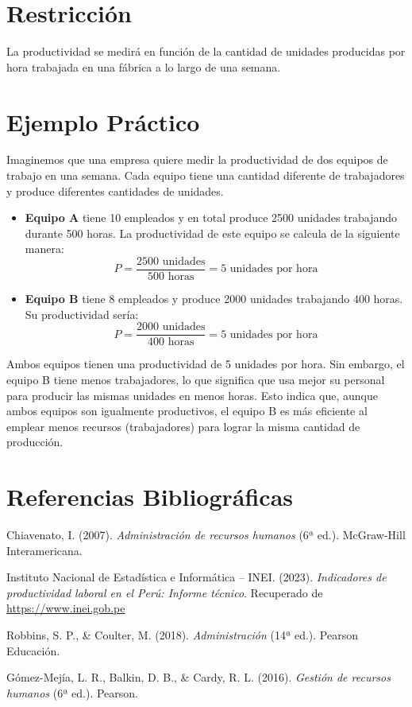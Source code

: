 \documentclass[]{article}
\begin{document}
	\section*{Restricción}
	
	La productividad se medirá en función de la cantidad de unidades producidas por hora trabajada en una fábrica a lo largo de una semana.
	
	\section*{Ejemplo Práctico}
	
	Imaginemos que una empresa quiere medir la productividad de dos equipos de trabajo en una semana. Cada equipo tiene una cantidad diferente de trabajadores y produce diferentes cantidades de unidades.
	
	\begin{itemize}
		\item \textbf{Equipo A} tiene 10 empleados y en total produce 2500 unidades trabajando durante 500 horas. La productividad de este equipo se calcula de la siguiente manera:
		\[
		P = \frac{2500 \text{ unidades}}{500 \text{ horas}} = 5 \text{ unidades por hora}
		\]
		\item \textbf{Equipo B} tiene 8 empleados y produce 2000 unidades trabajando 400 horas. Su productividad sería:
		\[
		P = \frac{2000 \text{ unidades}}{400 \text{ horas}} = 5 \text{ unidades por hora}
		\]
	\end{itemize}
	
	Ambos equipos tienen una productividad de 5 unidades por hora. Sin embargo, el equipo B tiene menos trabajadores, lo que significa que usa mejor su personal para producir las mismas unidades en menos horas. Esto indica que, aunque ambos equipos son igualmente productivos, el equipo B es más eficiente al emplear menos recursos (trabajadores) para lograr la misma cantidad de producción.
	
	\section*{Referencias Bibliográficas}
	
	\begin{thebibliography}{}
		
		Chiavenato, I. (2007). \textit{Administración de recursos humanos} (6ª ed.). McGraw-Hill Interamericana.
		
		Instituto Nacional de Estadística e Informática – INEI. (2023). \textit{Indicadores de productividad laboral en el Perú: Informe técnico}. Recuperado de \url{https://www.inei.gob.pe}
		
		Robbins, S. P., \& Coulter, M. (2018). \textit{Administración} (14ª ed.). Pearson Educación.
		
		Gómez-Mejía, L. R., Balkin, D. B., \& Cardy, R. L. (2016). \textit{Gestión de recursos humanos} (6ª ed.). Pearson.
		
	\end{thebibliography}
	
\end{document}
